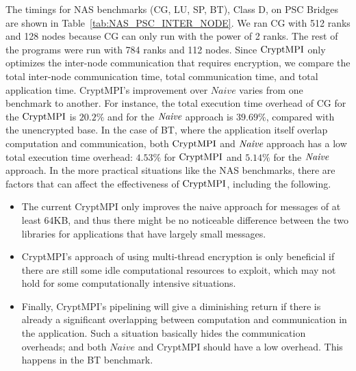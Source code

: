 {
The timings for NAS benchmarks (CG, LU, SP, BT), Class D,
on PSC Bridges are shown in Table~\ref{tab:NAS_PSC_INTER_NODE}.
We ran CG with 512 ranks and 128 nodes because CG can only run with the power of 2 ranks.
The rest of the programs were run with 784 ranks and 112 nodes. 
Since $\textrm{CryptMPI}$ only optimizes the inter-node communication that requires encryption,
we compare the total inter-node communication time, total communication time, and total
application time. CryptMPI's improvement over $Naive$ varies from one benchmark to another.
For instance, the total execution time
overhead of CG for the $\textrm{CryptMPI}$ is $20.2\%$ and for the ${\emph{Naive}}$ approach is $39.69\%$,
compared with the unencrypted base. In the case of BT, where the application itself overlap
computation and communication, both $\textrm{CryptMPI}$ and ${\emph{Naive}}$ approach
has a low total execution time overhead: $4.53\%$ for $\textrm{CryptMPI}$ and $5.14\%$ for the ${\emph{Naive}}$
approach. In the more practical situations like
the NAS benchmarks, there are factors that can affect the effectiveness
of $\textrm{CryptMPI}$, including the following.

\begin{itemize}
\item The current CryptMPI only improves the naive approach
  for messages of at least 64KB, and thus there might be no noticeable
    difference between the two libraries
    for applications that have largely small messages.

\item CryptMPI's approach of using multi-thread encryption is only
  beneficial if there are still some idle computational resources to
    exploit, which may not hold for some computationally intensive situations.

\item Finally, CryptMPI's pipelining will give a diminishing return if
  there is already a significant overlapping between computation and
    communication in the application. Such a situation basically hides
    the communication overheads; and both $Naive$ and CryptMPI should have
    a low overhead. This happens in the BT benchmark.
\end{itemize}
        
\begin{table}[!tbp]
		

\end{table}}
